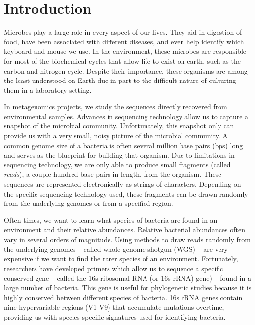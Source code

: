 \section{Introduction}

Microbes play a large role in every aspect of our lives.
They aid in digestion of food\cite{gill_metagenomic_2006}, have been associated with different diseases\cite{qin_metagenome-wide_2012}, and even help identify which keyboard and mouse we use\cite{fierer_forensic_2010}.
In the environment, these microbes are responsible for most of the biochemical cycles that allow life to exist on earth, such as the carbon and nitrogen cycle\cite{venter_environmental_2004}.
Despite their importance, these organisms are among the least understood on Earth due in part to the difficult nature of culturing them in a laboratory setting.

In metagenomics projects, we study the sequences directly recovered from environmental samples\cite{wooley_primer_2010}.
Advances in sequencing technology allow us to capture a snapshot of the microbial community.
Unfortunately, this snapshot only can provide us with a very small, noisy picture of the microbial community.
A common genome size of a bacteria is often several million base pairs (bps) long and serves as the blueprint for building that organism.
Due to limitations in sequencing technology, we are only able to produce small fragments (called \emph{reads}), a couple hundred base pairs in length, from the organism.
These sequences are represented electronically as strings of characters.
Depending on the specific sequencing technology used, these fragments can be drawn randomly from the underlying genomes or from a specified region.

Often times, we want to learn what species of bacteria are found in an environment and their relative abundances.
Relative bacterial abundances often vary in several orders of magnitude.
Using methods to draw reads randomly from the underlying genomes -- called whole genome shotgun (WGS) -- are very expensive if we want to find the rarer species of an environment.
Fortunately, researchers have developed primers which allow us to sequence a specific conserved gene -- called the 16s ribosomal RNA (or 16s rRNA) gene) -- found in a large number of bacteria.
This gene is useful for phylogenetic studies because it is highly conserved between different species of bacteria.
16s rRNA genes contain nine hypervariable regions (V1-V9) that accumulate mutations overtime, providing us with species-specific signatures used for identifying bacteria.

